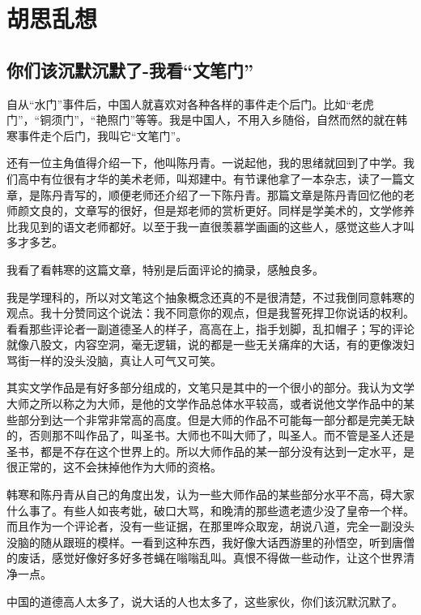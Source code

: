 \chapter{胡思乱想}

\section*{你们该沉默沉默了-我看“文笔门”}

自从“水门”事件后，中国人就喜欢对各种各样的事件走个后门。比如“老虎门”，“铜须门”，“艳照门”等等。我是中国人，不用入乡随俗，自然而然的就在韩寒事件走个后门，我叫它“文笔门”。

还有一位主角值得介绍一下，他叫陈丹青。一说起他，我的思绪就回到了中学。我们高中有位很有才华的美术老师，叫郑建中。有节课他拿了一本杂志，读了一篇文章，是陈丹青写的，顺便老师还介绍了一下陈丹青。那篇文章是陈丹青回忆他的老师颜文良的，文章写的很好，但是郑老师的赏析更好。同样是学美术的，文学修养比我见到的语文老师都好。以至于我一直很羡慕学画画的这些人，感觉这些人才叫多才多艺。

我看了看韩寒的这篇文章，特别是后面评论的摘录，感触良多。

我是学理科的，所以对文笔这个抽象概念还真的不是很清楚，不过我倒同意韩寒的观点。我十分赞同这个说法：我不同意你的观点，但是我誓死捍卫你说话的权利。看看那些评论者一副道德圣人的样子，高高在上，指手划脚，乱扣帽子；写的评论就像八股文，内容空洞，毫无逻辑，说的都是一些无关痛痒的大话，有的更像泼妇骂街一样的没头没脑，真让人可气又可笑。

其实文学作品是有好多部分组成的，文笔只是其中的一个很小的部分。我认为文学大师之所以称之为大师，是他的文学作品总体水平较高，或者说他文学作品中的某些部分到达一个非常非常高的高度。但是大师的作品不可能每一部分都是完美无缺的，否则那不叫作品了，叫圣书。大师也不叫大师了，叫圣人。而不管是圣人还是圣书，都是不存在这个世界上的。所以大师作品的某一部分没有达到一定水平，是很正常的，这不会抹掉他作为大师的资格。

韩寒和陈丹青从自己的角度出发，认为一些大师作品的某些部分水平不高，碍大家什么事了。有些人如丧考妣，破口大骂，和晚清的那些遗老遗少没了皇帝一个样。而且作为一个评论者，没有一些证据，在那里哗众取宠，胡说八道，完全一副没头没脑的随从跟班的模样。一看到这种东西，我好像大话西游里的孙悟空，听到唐僧的废话，感觉好像好多好多苍蝇在嗡嗡乱叫。真恨不得做一些动作，让这个世界清净一点。

中国的道德高人太多了，说大话的人也太多了，这些家伙，你们该沉默沉默了。



